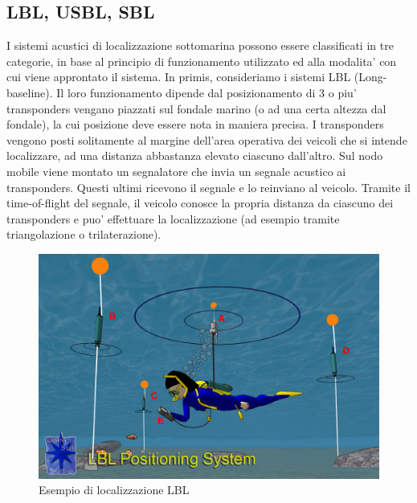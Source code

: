 \subsection{LBL, USBL, SBL}
I sistemi acustici di localizzazione sottomarina possono essere classificati in tre categorie, in base al principio di funzionamento utilizzato ed alla modalita' con cui viene approntato il sistema. \newline
In primis, consideriamo i sistemi LBL (Long-baseline).  Il loro funzionamento dipende dal posizionamento di 3 o piu' transponders vengano piazzati sul fondale marino (o ad una certa altezza dal fondale), la cui posizione deve essere nota in maniera precisa. 
I transponders vengono posti solitamente al margine dell'area operativa dei veicoli che si intende localizzare, ad una distanza abbastanza elevato ciascuno dall'altro. Sul nodo mobile viene montato un segnalatore che invia un segnale acustico ai transponders. \newline Questi ultimi ricevono il segnale e lo reinviano al veicolo. \newline Tramite il time-of-flight del segnale, il veicolo conosce la propria distanza da ciascuno dei transponders e puo' effettuare la localizzazione (ad esempio tramite triangolazione o trilaterazione).

\begin{figure}[H]
    \centering
	\includegraphics[scale=0.25]{LBL.jpg}
	\caption{ Esempio di localizzazione LBL}
	\label{fig:LBL}
\end{figure}
\newpage

